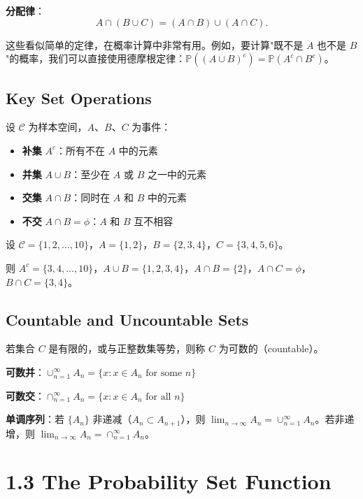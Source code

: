 \textbf{分配律}：
\[
A \cap (B \cup C) = (A \cap B) \cup (A \cap C).
\tag{1.2.2}\label{eq:distributive-law}
\]

这些看似简单的定律，在概率计算中非常有用。例如，要计算"既不是 $A$ 也不是 $B$"的概率，我们可以直接使用德摩根定律：$\mathbb{P}((A \cup B)^c) = \mathbb{P}(A^c \cap B^c)$。

\subsection{Key Set Operations}

设 $\mathcal{C}$ 为样本空间，$A$、$B$、$C$ 为事件：

\begin{itemize}
    \item \textbf{补集} $A^c$：所有不在 $A$ 中的元素
    \item \textbf{并集} $A \cup B$：至少在 $A$ 或 $B$ 之一中的元素
    \item \textbf{交集} $A \cap B$：同时在 $A$ 和 $B$ 中的元素
    \item \textbf{不交} $A \cap B = \phi$：$A$ 和 $B$ 互不相容
\end{itemize}

\begin{example}\label{ex:set-ops-ch1}
设 $\mathcal{C} = \{1, 2, \ldots, 10\}$，$A = \{1, 2\}$，$B = \{2, 3, 4\}$，$C = \{3, 4, 5, 6\}$。

则 $A^c = \{3,4,\ldots,10\}$，$A \cup B = \{1,2,3,4\}$，$A \cap B = \{2\}$，$A \cap C = \phi$，$B \cap C = \{3,4\}$。
\end{example}

\subsection{Countable and Uncountable Sets}

若集合 $C$ 是有限的，或与正整数集等势，则称 $C$ 为可数的（countable）。

\textbf{可数并}：$\cup_{n=1}^{\infty} A_n = \{x: x \in A_n \text{ for some } n\}$

\textbf{可数交}：$\cap_{n=1}^{\infty} A_n = \{x: x \in A_n \text{ for all } n\}$

\textbf{单调序列}：若 $\{A_n\}$ 非递减（$A_n \subset A_{n+1}$），则 $\lim_{n\to\infty} A_n = \cup_{n=1}^{\infty} A_n$。若非递增，则 $\lim_{n\to\infty} A_n = \cap_{n=1}^{\infty} A_n$。

\section{1.3 The Probability Set Function}\label{sec:1.3}

